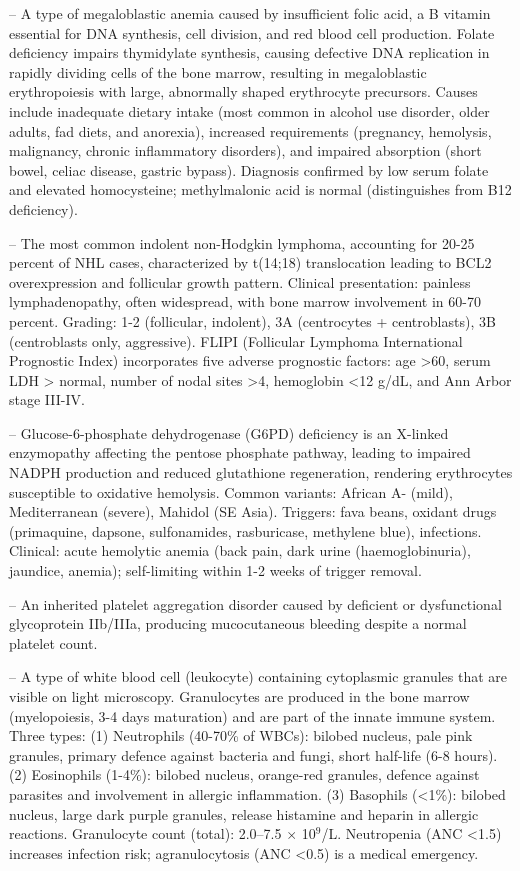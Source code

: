 -- A type of megaloblastic anemia caused by insufficient folic acid, a B vitamin essential for DNA synthesis, cell division, and red blood cell production. Folate deficiency impairs thymidylate synthesis, causing defective DNA replication in rapidly dividing cells of the bone marrow, resulting in megaloblastic erythropoiesis with large, abnormally shaped erythrocyte precursors. Causes include inadequate dietary intake (most common in alcohol use disorder, older adults, fad diets, and anorexia), increased requirements (pregnancy, hemolysis, malignancy, chronic inflammatory disorders), and impaired absorption (short bowel, celiac disease, gastric bypass). Diagnosis confirmed by low serum folate and elevated homocysteine; methylmalonic acid is normal (distinguishes from B12 deficiency).

-- The most common indolent non-Hodgkin lymphoma, accounting for 20-25 percent of NHL cases, characterized by t(14;18) translocation leading to BCL2 overexpression and follicular growth pattern. Clinical presentation: painless lymphadenopathy, often widespread, with bone marrow involvement in 60-70 percent. Grading: 1-2 (follicular, indolent), 3A (centrocytes + centroblasts), 3B (centroblasts only, aggressive). FLIPI (Follicular Lymphoma International Prognostic Index) incorporates five adverse prognostic factors: age >60, serum LDH > normal, number of nodal sites >4, hemoglobin <12 g/dL, and Ann Arbor stage III-IV.

-- Glucose-6-phosphate dehydrogenase (G6PD) deficiency is an X-linked enzymopathy affecting the pentose phosphate pathway, leading to impaired NADPH production and reduced glutathione regeneration, rendering erythrocytes susceptible to oxidative hemolysis. Common variants: African A- (mild), Mediterranean (severe), Mahidol (SE Asia). Triggers: fava beans, oxidant drugs (primaquine, dapsone, sulfonamides, rasburicase, methylene blue), infections. Clinical: acute hemolytic anemia (back pain, dark urine (haemoglobinuria), jaundice, anemia); self-limiting within 1-2 weeks of trigger removal.

-- An inherited platelet aggregation disorder caused by deficient or dysfunctional glycoprotein IIb/IIIa, producing mucocutaneous bleeding despite a normal platelet count.

-- A type of white blood cell (leukocyte) containing cytoplasmic granules that are visible on light microscopy. Granulocytes are produced in the bone marrow (myelopoiesis, 3-4 days maturation) and are part of the innate immune system. Three types: (1) Neutrophils (40-70\% of WBCs): bilobed nucleus, pale pink granules, primary defence against bacteria and fungi, short half-life (6-8 hours). (2) Eosinophils (1-4\%): bilobed nucleus, orange-red granules, defence against parasites and involvement in allergic inflammation. (3) Basophils (<1\%): bilobed nucleus, large dark purple granules, release histamine and heparin in allergic reactions. Granulocyte count (total): 2.0--7.5 $\times$ 10$^9$/L. Neutropenia (ANC <1.5) increases infection risk; agranulocytosis (ANC <0.5) is a medical emergency.

